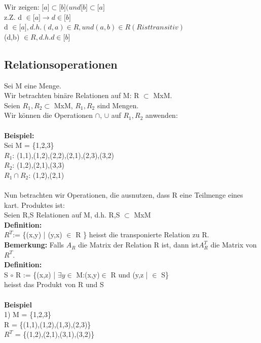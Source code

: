 \documentclass[11pt,a4paper]{article}
\begin{document}
Wir zeigen: $\lbrack a \rbrack \subset \lbrack b \rbrack (und \lbrack b \rbrack \subset \lbrack a \rbrack$\\
z.Z. d $\in \lbrack a \rbrack \rightarrow d \in \lbrack b \rbrack$ \\

d $\in \lbrack a \rbrack , d.h. (d,a) \in R, und (a,b) \in R (R ist transitiv)$\\
(d,b) $\in R,d.h. d \in \lbrack b \rbrack$

\subsection{Relationsoperationen}
Sei M eine Menge.\\
Wir betrachten binäre Relationen auf M: R $\subset$ MxM.\\
Seien $R_{1}, R_{2} \subset$ MxM, $R_{1}, R_{2}$ sind Mengen.\\
Wir können die Operationen $\cap$, $\cup$ auf $R_{1}, R_{2}$ anwenden:\\
\\
\textbf{Beispiel:}\\
Sei M = \{1,2,3\}\\
$R_{1}$: (1,1),(1,2),(2,2),(2,1),(2,3),(3,2)\\
$R_{2}$: (1,2),(2,1),(3,3)\\
$R_{1} \cap R_{2}$: (1,2),(2,1)\\
\\
Nun betrachten wir Operationen, die ausnutzen, dass R eine Teilmenge eines kart. Produktes ist:\\
Seien R,S Relationen auf M, d.h. R,S $\subset$ MxM\\
\textbf{Definition:}\\
$R^{T}$:= \{(x,y) | (y,x) $\in$ R \} heisst die transponierte Relation zu R.\\
\textbf{Bemerkung:} Falls $A_{R}$ die Matrix der Relation R ist, dann ist$ A_{R}^{T}$ die Matrix von $R^{T}$.\\
\textbf{Definition:}\\
S $\circ$ R := \{(x,z) | $\exists y \in$ M:(x,y)$\in$ R und (y,z | $\in$ S\}\\
heisst das Produkt von R und S\\
\\
\textbf{Beispiel}\\
1) M = \{1,2,3\}\\
R = \{(1,1),(1,2),(1,3),(2,3)\}\\
%
%
$R^{T}$ = \{(1,2),(2,1),(3,1),(3,2)\}\\
\end{document}
